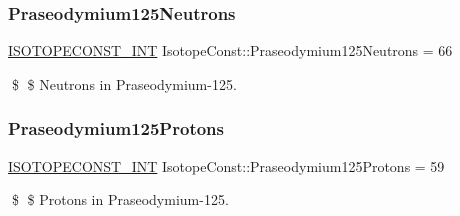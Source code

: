 \subsubsection{\texorpdfstring{Praseodymium125\+Neutrons}{Praseodymium125Neutrons}}
{\footnotesize\ttfamily \mbox{\hyperlink{group___isotope_const-_macros_ga5f18360b3e99483a35c32d789e62621c}{I\+S\+O\+T\+O\+P\+E\+C\+O\+N\+S\+T\+\_\+\+I\+NT}} Isotope\+Const\+::\+Praseodymium125\+Neutrons = 66}

\$ \$ Neutrons in Praseodymium-\/125. \mbox{\label{group___isotope_const-_praseodymium-_pr125_ga6f22e9d3b2449fa68153eb0511897c0b}} 
\subsubsection{\texorpdfstring{Praseodymium125\+Protons}{Praseodymium125Protons}}
{\footnotesize\ttfamily \mbox{\hyperlink{group___isotope_const-_macros_ga5f18360b3e99483a35c32d789e62621c}{I\+S\+O\+T\+O\+P\+E\+C\+O\+N\+S\+T\+\_\+\+I\+NT}} Isotope\+Const\+::\+Praseodymium125\+Protons = 59}

\$ \$ Protons in Praseodymium-\/125. 